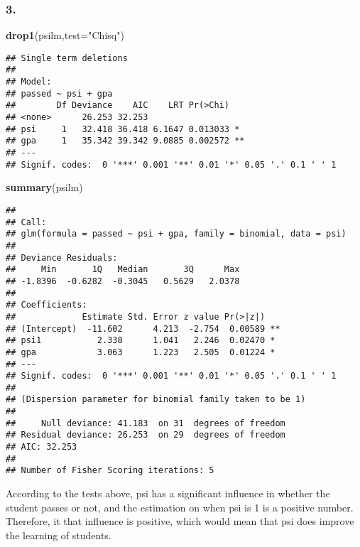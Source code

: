 \documentclass[11pt,]{article}
\newenvironment{Shaded}{\begin{snugshade}}{\end{snugshade}}
\newcommand{\KeywordTok}[1]{\textcolor[rgb]{0.13,0.29,0.53}{\textbf{{#1}}}}
\newcommand{\DataTypeTok}[1]{\textcolor[rgb]{0.13,0.29,0.53}{{#1}}}
\newcommand{\StringTok}[1]{\textcolor[rgb]{0.31,0.60,0.02}{{#1}}}
\newcommand{\NormalTok}[1]{{#1}}
\begin{document}
\subsubsection{3.}\label{section-9}

\begin{Shaded}
\begin{Highlighting}[]
\KeywordTok{drop1}\NormalTok{(psilm,}\DataTypeTok{test=}\StringTok{"Chisq"}\NormalTok{)}
\end{Highlighting}
\end{Shaded}

\begin{verbatim}
## Single term deletions
## 
## Model:
## passed ~ psi + gpa
##        Df Deviance    AIC    LRT Pr(>Chi)   
## <none>      26.253 32.253                   
## psi     1   32.418 36.418 6.1647 0.013033 * 
## gpa     1   35.342 39.342 9.0885 0.002572 **
## ---
## Signif. codes:  0 '***' 0.001 '**' 0.01 '*' 0.05 '.' 0.1 ' ' 1
\end{verbatim}

\begin{Shaded}
\begin{Highlighting}[]
\KeywordTok{summary}\NormalTok{(psilm)}
\end{Highlighting}
\end{Shaded}

\begin{verbatim}
## 
## Call:
## glm(formula = passed ~ psi + gpa, family = binomial, data = psi)
## 
## Deviance Residuals: 
##     Min       1Q   Median       3Q      Max  
## -1.8396  -0.6282  -0.3045   0.5629   2.0378  
## 
## Coefficients:
##             Estimate Std. Error z value Pr(>|z|)   
## (Intercept)  -11.602      4.213  -2.754  0.00589 **
## psi1           2.338      1.041   2.246  0.02470 * 
## gpa            3.063      1.223   2.505  0.01224 * 
## ---
## Signif. codes:  0 '***' 0.001 '**' 0.01 '*' 0.05 '.' 0.1 ' ' 1
## 
## (Dispersion parameter for binomial family taken to be 1)
## 
##     Null deviance: 41.183  on 31  degrees of freedom
## Residual deviance: 26.253  on 29  degrees of freedom
## AIC: 32.253
## 
## Number of Fisher Scoring iterations: 5
\end{verbatim}

According to the tests above, psi has a significant influence in whether
the student passes or not, and the estimation on when psi is 1 is a
positive number. Therefore, it that influence is positive, which would
mean that psi does improve the learning of students.
\end{document}
